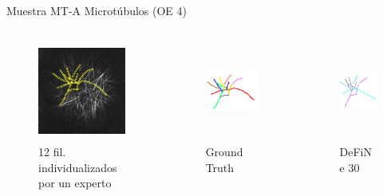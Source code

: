 \begin{frame}{Muestra MT-A Microt\'ubulos (OE 4)}
\vspace{-1cm}
    \begin{columns}
        \begin{column}{0.22\textwidth}
            \begin{figure}
                \centering
                \includegraphics[height=1.3in]{Pictures/SPINNING-DISK-MARCHANTIA-rois-unlabeled.png}
                \caption{12 fil. individualizados por un experto}
            \end{figure}
        \end{column}
        \begin{column}{0.22\textwidth}
            \begin{figure}
                \centering
                \includegraphics[height=1.3in]{Pictures/50-ROIs-Spinning-Marchantia-solved-rot-unlabeled.png}
                \caption{Ground Truth}
            \end{figure}
        \end{column}
        \begin{column}{0.22\textwidth}
            \begin{figure}
                \centering
                \includegraphics[height=1.3in]{Pictures/50-ROIs-Spinning-Marchantia-DeFiNeExactMatch-30.png}
                \caption{DeFiNe 30\textdegree}
            \end{figure}
        \end{column}

\end{columns}
\end{frame}
